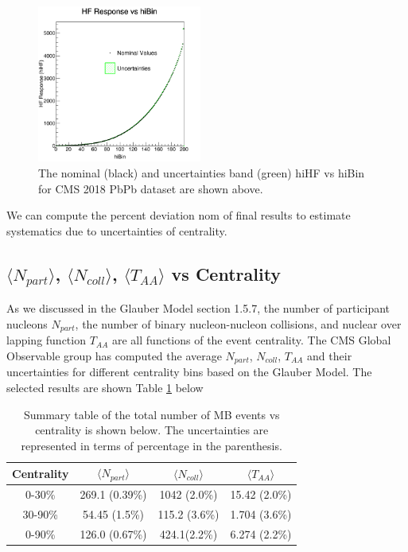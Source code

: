 \begin{figure}[h]
\begin{center}
\includegraphics[width= 0.48\textwidth]{Figures/Chapter5/hiHFvsCent.png}
\caption{The nominal (black) and uncertainties band (green) hiHF vs hiBin for CMS 2018 PbPb dataset are shown above.}
\label{hiHFvsCent}
\end{center}
\end{figure}


We can compute the percent deviation nom of final results to estimate systematics due to uncertainties of centrality. 


\subsection{$\langle N_{part} \rangle$, $\langle N_{coll} \rangle$, $\langle T_{AA} \rangle$ vs Centrality}

As we discussed in the Glauber Model \cite{CentPlot,Glauber} section 1.5.7, the number of participant nucleons $N_{part}$, the number of binary nucleon-nucleon collisions, and nuclear over lapping function $T_{AA}$ are all functions of the event centrality. The CMS Global Observable group has computed the average $N_{part} $, $N_{coll} $, $T_{AA}$ and their uncertainties  for different centrality bins based on the Glauber Model. The selected results are shown Table \ref{GOvsCent} below


\begin{table}[h]
\begin{center}
\caption{Summary table of the total number of MB events vs centrality is shown below. The uncertainties are represented in terms of percentage in the parenthesis.}
\vspace{1em}
\label{GOvsCent}
  \begin{tabular}{ |c | c| c| c|}
    \hline 
Centrality &  $\langle N_{part} \rangle$ &$\langle N_{coll} \rangle$  & $\langle T_{AA} \rangle$  \\
     \hline
         \hline
0-30\% &  269.1 (0.39\%)  &  1042 (2.0\%) &	15.42 (2.0\%)   \\
30-90\% & 54.45 (1.5\%)   & 115.2 (3.6\%)  &   1.704 (3.6\%)  \\
0-90\% & 126.0 (0.67\%)   &  424.1(2.2\%)  &    6.274 (2.2\%)  \\
     \hline
    \hline
\end{tabular}
\end{center}
\end{table}

